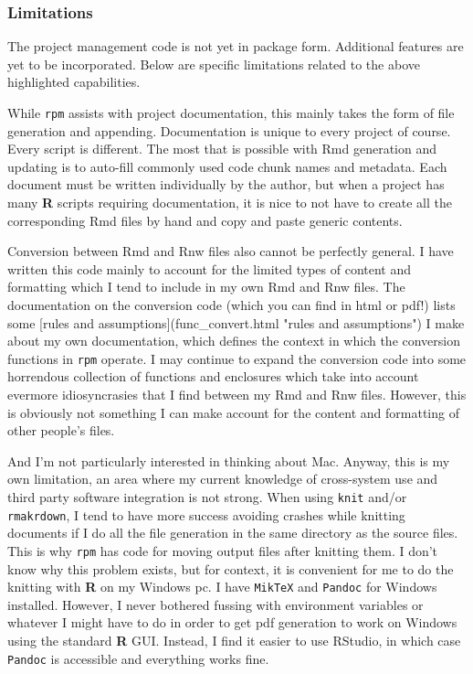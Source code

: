 \documentclass{article}\usepackage[]{graphicx}\usepackage[]{color}
\begin{document}
\subsubsection{Limitations}

The project management code is not yet in package form.
Additional features are yet to be incorporated.
Below are specific limitations related to the above highlighted capabilities.

While \texttt{rpm} assists with project documentation, this mainly takes the form of file generation and appending.
Documentation is unique to every project of course. Every script is different.
The most that is possible with Rmd generation and updating is to auto-fill commonly used code chunk names and metadata.
Each document must be written individually by the author, but when a project has many \textbf{R} scripts requiring documentation,
it is nice to not have to create all the corresponding Rmd files by hand and copy and paste generic contents.

Conversion between Rmd and Rnw files also cannot be perfectly general.
I have written this code mainly to account for the limited types of content and formatting which I tend to include in my own Rmd and Rnw files.
The documentation on the conversion code (which you can find in html or pdf!) lists some [rules and assumptions](func_convert.html "rules and assumptions") I make about my own documentation,
which defines the context in which the conversion functions in \texttt{rpm} operate.
I may continue to expand the conversion code into some horrendous collection of functions and enclosures which take into account evermore idiosyncrasies that I find between my Rmd and Rnw files.
However, this is obviously not something I can make account for the content and formatting of other people's files.

And I'm not particularly interested in thinking about Mac.
Anyway, this is my own limitation, an area where my current knowledge of cross-system use and third party software integration is not strong.
When using \texttt{knit} and/or \texttt{rmakrdown}, I tend to have more success avoiding crashes while knitting documents if I do all the file generation in the same directory as the source files.
This is why \texttt{rpm} has code for moving output files after knitting them.
I don't know why this problem exists, but for context, it is convenient for me to do the knitting with \textbf{R} on my Windows pc.
I have \texttt{MikTeX} and \texttt{Pandoc} for Windows installed.
However, I never bothered fussing with environment variables or whatever I might have to do in order to get pdf generation to work on Windows using the standard \textbf{R} GUI.
Instead, I find it easier to use RStudio, in which case \texttt{Pandoc} is accessible and everything works fine.
\end{document}
